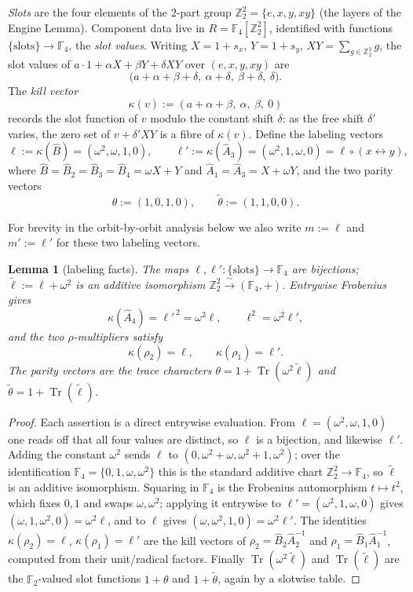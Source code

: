 \documentclass[11pt]{article}
\newcommand{\Z}{\mathbb{Z}}
\newcommand{\F}[1]{\mathbb{F}_{#1}}
\newcommand{\hA}{\hat{A}}
\newcommand{\hB}{\hat{B}}
\newcommand{\slab}{\ell}                          %
\theoremstyle{plain}
\newtheorem{lemma}{Lemma}[section]
\theoremstyle{definition}
\theoremstyle{remark}
\begin{document}
\emph{Slots} are the four elements of the $2$-part group $\Z_2^2=\{e,x,y,xy\}$
(the layers of the Engine Lemma). Component data live in $R=\F4[\Z_2^2]$,
identified with functions $\{\text{slots}\}\to\F4$, the \emph{slot values}.
Writing $X=1+s_x$, $Y=1+s_y$, $XY=\sum_{g\in\Z_2^2}g$, the slot values of
$a\cdot 1+\alpha X+\beta Y+\delta XY$ over $(e,x,y,xy)$ are
\[
  \bigl(a+\alpha+\beta+\delta,\ \alpha+\delta,\ \beta+\delta,\ \delta\bigr).
\]
The \emph{kill vector}
\[
  \kappa(v):=(a+\alpha+\beta,\ \alpha,\ \beta,\ 0)
\]
records the slot function of $v$ modulo the constant shift $\delta$: as the free
shift $\delta'$ varies, the zero set of $v+\delta'XY$ is a fibre of $\kappa(v)$.
Define the labeling vectors
\[
  \slab:=\kappa(\hB)=(\omega^2,\omega,1,0),\qquad
  \slab':=\kappa(\hA_3)=(\omega^2,1,\omega,0)=\slab\circ(x\leftrightarrow y),
\]
where $\hB=\hB_2=\hB_3=\hB_4=\omega X+Y$ and $\hA_1=\hA_3=X+\omega Y$, and the
two parity vectors
\[
  \theta:=(1,0,1,0),\qquad \tilde\theta:=(1,1,0,0).
\]

For brevity in the orbit-by-orbit analysis below we also write $m:=\slab$ and $m':=\slab'$
for these two labeling vectors.

\begin{lemma}[labeling facts]\label{lem:labelfacts}
The maps $\slab,\slab'\colon\{\text{slots}\}\to\F4$ are bijections;
$\tilde{\slab}:=\slab+\omega^2$ is an additive isomorphism
$\Z_2^2\xrightarrow{\ \sim\ }(\F4,+)$. Entrywise Frobenius gives
\[
  \kappa(\hA_4)=\slab'^{\,2}=\omega^2\slab,\qquad \slab^2=\omega^2\slab',
\]
and the two $\rho$-multipliers satisfy
\[
  \kappa(\rho_2)=\slab,\qquad \kappa(\rho_1)=\slab'.
\]
The parity vectors are the trace characters
$\theta=1+\operatorname{Tr}(\omega^2\tilde{\slab})$ and
$\tilde\theta=1+\operatorname{Tr}(\tilde{\slab})$.
\end{lemma}

\begin{proof}
Each assertion is a direct entrywise evaluation. From
$\slab=(\omega^2,\omega,1,0)$ one reads off that all four values are distinct,
so $\slab$ is a bijection, and likewise $\slab'$. Adding the constant
$\omega^2$ sends $\slab$ to $(0,\omega^2+\omega,\omega^2+1,\omega^2)$; over the
identification $\F4=\{0,1,\omega,\omega^2\}$ this is the standard additive chart
$\Z_2^2\to\F4$, so $\tilde{\slab}$ is an additive isomorphism. Squaring in
$\F4$ is the Frobenius automorphism $t\mapsto t^2$, which fixes $0,1$ and swaps
$\omega,\omega^2$; applying it entrywise to $\slab'=(\omega^2,1,\omega,0)$ gives
$(\omega,1,\omega^2,0)=\omega^2\slab$, and to $\slab$ gives
$(\omega,\omega^2,1,0)=\omega^2\slab'$. The identities $\kappa(\rho_2)=\slab$,
$\kappa(\rho_1)=\slab'$ are the kill vectors of $\rho_2=\hB_2\hA_2^{-1}$ and
$\rho_1=\hB_1\hA_1^{-1}$, computed from their unit/radical factors. Finally
$\operatorname{Tr}(\omega^2\tilde{\slab})$ and $\operatorname{Tr}(\tilde{\slab})$
are the $\F2$-valued slot functions $1+\theta$ and $1+\tilde\theta$, again by a
slotwise table.
\end{proof}
\end{document}
